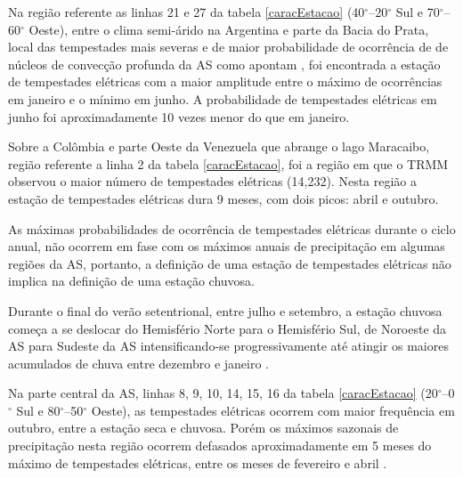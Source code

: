  

Na região referente as linhas 21 e 27 da tabela \ref{caracEstacao} (40$^{\circ}$--20$^{\circ}$ Sul e 70$^{\circ}$--60$^{\circ}$ Oeste),  entre o clima semi-árido na Argentina e parte da Bacia do Prata,  local das tempestades mais severas e de maior probabilidade de ocorrência de de núcleos de convecção profunda da AS como apontam , foi encontrada a estação de tempestades elétricas com a maior amplitude entre o máximo de ocorrências em janeiro e o mínimo em junho. A probabilidade de tempestades elétricas em junho foi aproximadamente 10 vezes menor do que em janeiro.




Sobre a Colômbia e parte Oeste da Venezuela que abrange o lago Maracaibo, região referente a linha 2 da tabela \ref{caracEstacao}, foi a região em que o TRMM observou o maior número de tempestades elétricas (14,232). Nesta região a estação de tempestades elétricas dura  9 meses, com dois picos: abril e outubro.


As máximas probabilidades de ocorrência de tempestades elétricas durante o ciclo anual, não ocorrem em fase com os máximos anuais de precipitação em algumas regiões da AS, portanto, a definição de uma estação de tempestades elétricas não implica na definição de uma estação chuvosa. 

Durante o final do verão setentrional, entre julho e setembro, a estação chuvosa começa a se deslocar do Hemisfério Norte para o Hemisfério Sul, de Noroeste da AS para Sudeste da AS intensificando-se progressivamente até atingir os maiores acumulados de chuva entre dezembro e janeiro \cite{grimm2003nino,reboita2010regimes,Marengo2012,shi-atlas,bombardi2008variabilidade,cusdodioTese}.
 
Na parte central da AS, linhas  8, 9, 10, 14, 15, 16 da tabela \ref{caracEstacao} (20$^{\circ}$--0$^{\circ}$ Sul e 80$^{\circ}$--50$^{\circ}$ Oeste), as tempestades elétricas ocorrem com maior frequência em outubro, entre a estação seca e chuvosa. Porém os máximos sazonais de precipitação nesta região ocorrem defasados aproximadamente em 5 meses do máximo de tempestades elétricas, entre os meses de fevereiro e abril \cite{grimm2003nino,reboita2010regimes,shi-atlas,bombardi2008variabilidade,cusdodioTese}.

